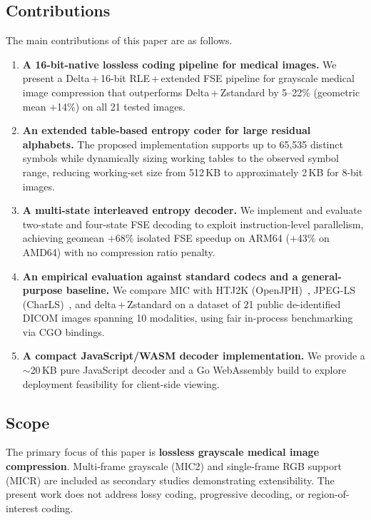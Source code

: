 \documentclass[journal]{IEEEtran}
\begin{document}
\subsection{Contributions}

The main contributions of this paper are as follows.

\begin{enumerate}
  \item \textbf{A 16-bit-native lossless coding pipeline for medical images.}
  We present a Delta\,+\,16-bit RLE\,+\,extended FSE pipeline for grayscale
  medical image compression that outperforms Delta\,+\,Zstandard by 5--22\%
  (geometric mean $+$14\%) on all 21 tested images.

  \item \textbf{An extended table-based entropy coder for large residual
  alphabets.}
  The proposed implementation supports up to 65,535 distinct symbols while
  dynamically sizing working tables to the observed symbol range, reducing
  working-set size from 512\,KB to approximately 2\,KB for 8-bit images.

  \item \textbf{A multi-state interleaved entropy decoder.}
  We implement and evaluate two-state and four-state FSE decoding to exploit
  instruction-level parallelism, achieving geomean $+$68\% isolated FSE
  speedup on ARM64 ($+$43\% on AMD64) with no compression ratio penalty.

  \item \textbf{An empirical evaluation against standard codecs and a
  general-purpose baseline.}
  We compare MIC with HTJ2K (OpenJPH)~\cite{openjph}, JPEG-LS
  (CharLS)~\cite{charls}, and delta\,+\,Zstandard on a dataset of 21 public
  de-identified DICOM images spanning 10 modalities, using fair in-process
  benchmarking via CGO bindings.

  \item \textbf{A compact JavaScript/WASM decoder implementation.}
  We provide a ${\sim}$20\,KB pure JavaScript decoder and a Go WebAssembly
  build to explore deployment feasibility for client-side viewing.
\end{enumerate}

\subsection{Scope}

The primary focus of this paper is \textbf{lossless grayscale medical image
compression}. Multi-frame grayscale (MIC2) and single-frame RGB support (MICR)
are included as secondary studies demonstrating extensibility. The present work
does not address lossy coding, progressive decoding, or region-of-interest
coding.
\end{document}
